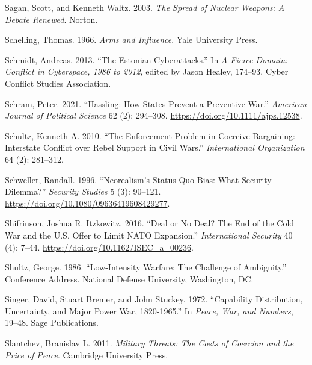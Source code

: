 \documentclass[
]{article}
\begin{document}
\leavevmode\hypertarget{ref-sagan_spreadnuclearweapons_2003}{}%
Sagan, Scott, and Kenneth Waltz. 2003. \emph{The Spread of Nuclear Weapons: A Debate Renewed}. Norton.

\leavevmode\hypertarget{ref-schelling_armsinfluence_1966}{}%
Schelling, Thomas. 1966. \emph{Arms and Influence}. Yale University Press.

\leavevmode\hypertarget{ref-schmidt_estoniancyberattacks_2013}{}%
Schmidt, Andreas. 2013. ``The Estonian Cyberattacks.'' In \emph{A Fierce Domain: Conflict in Cyberspace, 1986 to 2012}, edited by Jason Healey, 174--93. Cyber Conflict Studies Association.

\leavevmode\hypertarget{ref-schram_hasslinghowstates_2021}{}%
Schram, Peter. 2021. ``Hassling: How States Prevent a Preventive War.'' \emph{American Journal of Political Science} 62 (2): 294--308. \url{https://doi.org/10.1111/ajps.12538}.

\leavevmode\hypertarget{ref-schultz_enforcementproblemcoercive_2010}{}%
Schultz, Kenneth A. 2010. ``The Enforcement Problem in Coercive Bargaining: Interstate Conflict over Rebel Support in Civil Wars.'' \emph{International Organization} 64 (2): 281--312.

\leavevmode\hypertarget{ref-schweller_neorealismstatusquo_1996}{}%
Schweller, Randall. 1996. ``Neorealism's Status-Quo Bias: What Security Dilemma?'' \emph{Security Studies} 5 (3): 90--121. \url{https://doi.org/10.1080/09636419608429277}.

\leavevmode\hypertarget{ref-shifrinson_dealnodeal_2016}{}%
Shifrinson, Joshua R. Itzkowitz. 2016. ``Deal or No Deal? The End of the Cold War and the U.S. Offer to Limit NATO Expansion.'' \emph{International Security} 40 (4): 7--44. \url{https://doi.org/10.1162/ISEC_a_00236}.

\leavevmode\hypertarget{ref-shultz_lowintensitywarfarechallenge_1986}{}%
Shultz, George. 1986. ``Low-Intensity Warfare: The Challenge of Ambiguity.'' Conference Address. National Defense University, Washington, DC.

\leavevmode\hypertarget{ref-singer_capabilitydistributionuncertainty_1972}{}%
Singer, David, Stuart Bremer, and John Stuckey. 1972. ``Capability Distribution, Uncertainty, and Major Power War, 1820-1965.'' In \emph{Peace, War, and Numbers}, 19--48. Sage Publications.

\leavevmode\hypertarget{ref-slantchev_militarythreatscosts_2011}{}%
Slantchev, Branislav L. 2011. \emph{Military Threats: The Costs of Coercion and the Price of Peace}. Cambridge University Press.
\end{document}
